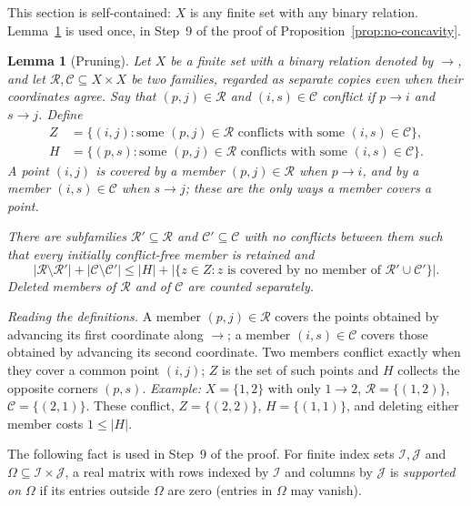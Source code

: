 \documentclass[11pt]{article}
\newtheorem{lemma}[theorem]{Lemma}
\theoremstyle{remark}
\newcommand{\abs}[1]{\lvert #1\rvert}
\newcommand{\cR}{\mathcal R}
\newcommand{\cC}{\mathcal C}
\begin{document}
This section is self-contained: $X$ is any finite set with any binary
relation. Lemma~\ref{lem:pruning} is used once, in Step~9 of the proof of
Proposition~\ref{prop:no-concavity}.

\begin{lemma}[Pruning]\label{lem:pruning}
Let $X$ be a finite set with a binary relation denoted by $\to$, and let
$\cR,\cC\subseteq X\times X$ be two families, regarded as
separate copies even when their coordinates agree. Say that
$(p,j)\in\cR$ and $(i,s)\in\cC$ \emph{conflict} if
$p\to i$ and $s\to j$. Define
\begin{align*}
 Z&=\{(i,j):\text{some }(p,j)\in\cR\text{ conflicts with some }(i,s)\in\cC\},\\
 H&=\{(p,s):\text{some }(p,j)\in\cR\text{ conflicts with some }(i,s)\in\cC\}.
\end{align*}
A point $(i,j)$ is \emph{covered} by a member $(p,j)\in\cR$ when
$p\to i$, and by a member $(i,s)\in\cC$ when $s\to j$;
these are the only ways a member covers a point.

There are subfamilies $\cR'\subseteq\cR$ and $\cC'\subseteq\cC$ with no
conflicts between them such that every initially conflict-free member is
retained and
\begin{equation}\label{eq:pruning-bound}
 \abs{\cR\setminus\cR'}+\abs{\cC\setminus\cC'}
 \leq\abs H+\abs{\{z\in Z:z\text{ is covered by no member of }\cR'\cup\cC'\}}.
\end{equation}
Deleted members of $\cR$ and of $\cC$ are counted separately.
\end{lemma}

\emph{Reading the definitions.} A member $(p,j)\in\cR$ covers the points
obtained by advancing its first coordinate along $\to$; a member
$(i,s)\in\cC$ covers those obtained by advancing its second coordinate. Two
members conflict exactly when they cover a common point $(i,j)$; $Z$ is the set
of such points and $H$ collects the opposite corners $(p,s)$.
\emph{Example:} $X=\{1,2\}$ with only $1\to2$, $\cR=\{(1,2)\}$,
$\cC=\{(2,1)\}$. These conflict, $Z=\{(2,2)\}$, $H=\{(1,1)\}$, and deleting
either member costs $1\le\abs H$.

The following fact is used in Step~9 of the proof. For finite index sets
$\mathcal I,\mathcal J$ and $\Omega\subseteq\mathcal I\times\mathcal J$, a real
matrix with rows indexed by $\mathcal I$ and columns by $\mathcal J$ is
\emph{supported on $\Omega$} if its entries outside $\Omega$ are zero (entries
in $\Omega$ may vanish).
\end{document}
